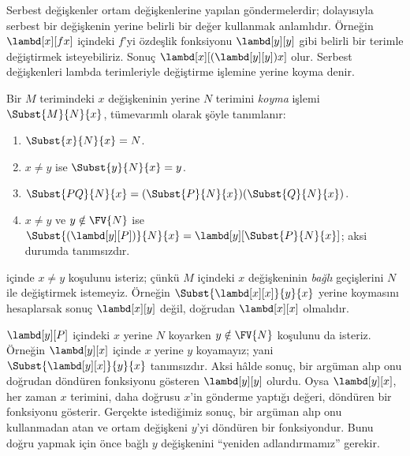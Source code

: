


\begin{explain}
Serbest değişkenler ortam değişkenlerine yapılan göndermelerdir; dolayısıyla
serbest bir değişkenin yerine belirli bir değer kullanmak anlamlıdır. Örneğin
$\lambd[x][f x]$ içindeki $f$'yi özdeşlik fonksiyonu $\lambd[y][y]$ gibi
belirli bir terimle değiştirmek isteyebiliriz. Sonuç
$\lambd[x][(\lambd[y][y]) x]$ olur. Serbest değişkenleri lambda terimleriyle
değiştirme işlemine yerine koyma denir.
\end{explain}

\begin{defn} 
  Bir $M$ terimindeki $x$ değişkeninin yerine $N$ terimini
  \emph{koyma} işlemi $\Subst{M}{N}{x}$, tümevarımlı olarak şöyle tanımlanır:
  \begin{enumerate}
    \item $\Subst{x}{N}{x} = N$. 
    \item $x \neq y$ ise $\Subst{y}{N}{x}  = y$.
    \item $\Subst{PQ}{N}{x}  = (\Subst{P}{N}{x}) (\Subst{Q}{N}{x})$.
    \item $x \neq y$ ve $y \notin \FV{N}$ ise
      $\Subst{(\lambd[y][P])}{N}{x} =
      \lambd[y][\Subst{P}{N}{x}]$; aksi durumda tanımsızdır.
  \end{enumerate}
\end{defn}

\begin{explain}
 içinde $x\neq y$
koşulunu isteriz; çünkü $M$ içindeki $x$ değişkeninin \emph{bağlı}
geçişlerini $N$ ile değiştirmek istemeyiz. Örneğin
$\Subst{\lambd[x][x]}{y}{x}$ yerine koymasını hesaplarsak sonuç
$\lambd[x][y]$ değil, doğrudan $\lambd[x][x]$ olmalıdır.

$\lambd[y][P]$ içindeki $x$ yerine $N$ koyarken $y\notin\FV{N}$ koşulunu da
isteriz. Örneğin $\lambd[y][x]$ içinde $x$ yerine $y$ koyamayız; yani
$\Subst{\lambd[y][x]}{y}{x}$ tanımsızdır. Aksi hâlde sonuç, bir argüman alıp
onu doğrudan döndüren fonksiyonu gösteren $\lambd[y][y]$ olurdu. Oysa
$\lambd[y][x]$, her zaman $x$ terimini, daha doğrusu $x$'in gönderme yaptığı
değeri, döndüren bir fonksiyonu gösterir. Gerçekte istediğimiz sonuç, bir
argüman alıp onu kullanmadan atan ve ortam değişkeni $y$'yi döndüren bir
fonksiyondur. Bunu doğru yapmak için önce bağlı $y$ değişkenini
``yeniden adlandırmamız'' gerekir.
\end{explain}

